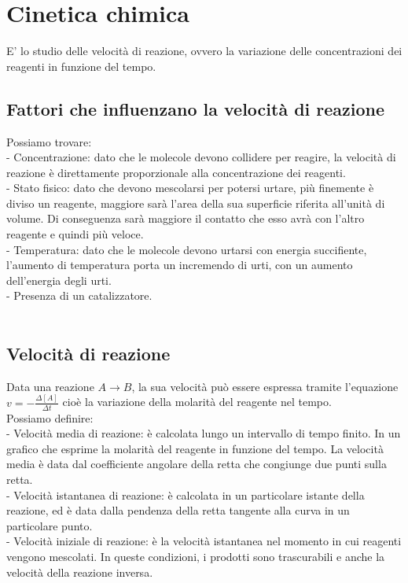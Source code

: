 \section{Cinetica chimica}
E' lo studio delle velocità di reazione, ovvero la variazione delle concentrazioni dei reagenti in funzione del tempo.
\subsection{Fattori che influenzano la velocità di reazione}
Possiamo trovare:\\
\tab- Concentrazione: dato che le molecole devono collidere per reagire, la velocità di reazione è direttamente proporzionale alla concentrazione dei reagenti.\\
\tab- Stato fisico: dato che devono mescolarsi per potersi urtare, più finemente è diviso un reagente, maggiore sarà l'area della sua superficie riferita all'unità di volume. Di conseguenza sarà maggiore il contatto che esso avrà con l'altro reagente e quindi più veloce.\\
\tab- Temperatura: dato che le molecole devono urtarsi con energia succifiente, l'aumento di temperatura porta un incremendo di urti, con un aumento dell'energia degli urti.\\
\tab- Presenza di un catalizzatore.\\\\
\subsection{Velocità di reazione}
Data una reazione $ A \rightarrow B$, la sua velocità può essere espressa tramite l'equazione $v = -\frac{\Delta [A]}{\Delta t}$ cioè la variazione della molarità del reagente nel tempo.\\
Possiamo definire:\\
\tab- Velocità media di reazione: è calcolata lungo un intervallo di tempo finito. In un grafico che esprime la molarità del reagente in funzione del tempo. La velocità media è data dal coefficiente angolare della retta che congiunge due punti sulla retta.\\
\tab- Velocità istantanea di reazione: è calcolata in un particolare istante della reazione, ed è data dalla pendenza della retta tangente alla curva in un particolare punto.\\
\tab- Velocità iniziale di reazione: è la velocità istantanea nel momento in cui reagenti vengono mescolati. In queste condizioni, i prodotti sono trascurabili e anche la velocità della reazione inversa.\\\\
